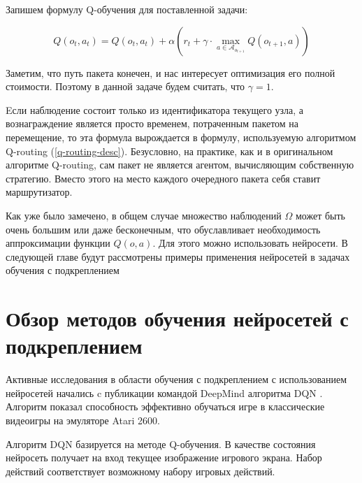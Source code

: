 \documentclass[specification,annotation,times]{itmo-student-thesis}
\theoremstyle{definition}
\begin{document}
Запишем формулу Q-обучения для поставленной задачи:

\begin{equation}
Q(o_t, a_t) = Q(o_t, a_t) + \alpha \left( r_t +
\gamma \cdot \max\limits_{a \in \mathcal{A}_{o_{t+1}}} Q(o_{t+1}, a) \right)
\end{equation}

Заметим, что путь пакета конечен, и нас интересует оптимизация его полной
стоимости. Поэтому в данной задаче будем считать, что $\gamma = 1$.

Eсли наблюдение состоит только из идентификатора текущего
узла, а вознаграждение является просто временем, потраченным пакетом на
перемещение, то эта формула вырождается в формулу, используемую алгоритмом
Q-routing (\ref{q-routing-desc}). Безусловно, на практике, как и в оригинальном
алгоритме Q-routing, сам пакет не является агентом, вычисляющим собственную
стратегию. Вместо этого на место каждого очередного пакета себя ставит
маршрутизатор.

Как уже было замечено, в общем случае множество наблюдений $\Omega$ может быть
очень большим или даже бесконечным, что обуславливает необходимость
аппроксимации функции $Q(o, a)$. Для этого можно использовать нейросети. В
следующей главе будут рассмотрены примеры применения нейросетей в задачах
обучения с подкреплением

\section{Обзор методов обучения нейросетей с подкреплением}\label{overview:nns}

Активные исследования в области обучения с подкреплением с использованием
нейросетей начались c публикации командой DeepMind алгоритма
DQN \cite{deepmind-dqn-orig}. Алгоритм показал способность эффективно обучаться
игре в классические видеоигры на эмуляторе Atari 2600. 

Алгоритм DQN базируется на методе Q-обучения. В качестве состояния нейросеть
получает на вход текущее изображение игрового экрана. Набор действий
соответствует возможному набору игровых действий.
\end{document}
